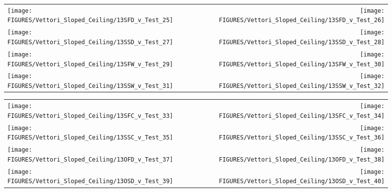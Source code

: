 \begin{figure}[p]
\begin{tabular*}{\textwidth}{l@{\extracolsep{\fill}}r}
\texttt{[image: FIGURES/Vettori\_Sloped\_Ceiling/13SFD\_v\_Test\_25]} &
\texttt{[image: FIGURES/Vettori\_Sloped\_Ceiling/13SFD\_v\_Test\_26]} \\
\texttt{[image: FIGURES/Vettori\_Sloped\_Ceiling/13SSD\_v\_Test\_27]} &
\texttt{[image: FIGURES/Vettori\_Sloped\_Ceiling/13SSD\_v\_Test\_28]} \\
\texttt{[image: FIGURES/Vettori\_Sloped\_Ceiling/13SFW\_v\_Test\_29]} &
\texttt{[image: FIGURES/Vettori\_Sloped\_Ceiling/13SFW\_v\_Test\_30]} \\
\texttt{[image: FIGURES/Vettori\_Sloped\_Ceiling/13SSW\_v\_Test\_31]} &
\texttt{[image: FIGURES/Vettori\_Sloped\_Ceiling/13SSW\_v\_Test\_32]} \\
\end{tabular*}
\label{Vettori_Sloped_4}
\end{figure}

\begin{figure}[p]
\begin{tabular*}{\textwidth}{l@{\extracolsep{\fill}}r}
\texttt{[image: FIGURES/Vettori\_Sloped\_Ceiling/13SFC\_v\_Test\_33]} &
\texttt{[image: FIGURES/Vettori\_Sloped\_Ceiling/13SFC\_v\_Test\_34]} \\
\texttt{[image: FIGURES/Vettori\_Sloped\_Ceiling/13SSC\_v\_Test\_35]} &
\texttt{[image: FIGURES/Vettori\_Sloped\_Ceiling/13SSC\_v\_Test\_36]} \\
\texttt{[image: FIGURES/Vettori\_Sloped\_Ceiling/13OFD\_v\_Test\_37]} &
\texttt{[image: FIGURES/Vettori\_Sloped\_Ceiling/13OFD\_v\_Test\_38]} \\
\texttt{[image: FIGURES/Vettori\_Sloped\_Ceiling/13OSD\_v\_Test\_39]} &
\texttt{[image: FIGURES/Vettori\_Sloped\_Ceiling/13OSD\_v\_Test\_40]} \\
\end{tabular*}
\label{Vettori_Sloped_5}
\end{figure}

